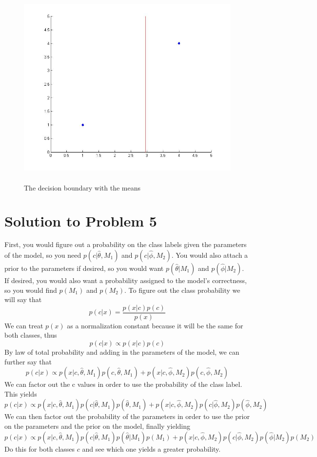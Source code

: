 \documentclass[11pt,psfig]{article}
\begin{document}
\begin{figure}[H]
\centering
\includegraphics[height=4in]{plot4_part2.jpg}
\caption{The decision boundary with the means}
\end{figure}

\newpage

\section*{Solution to Problem 5}

First, you would figure out a probability on the class labels given the parameters of the model, so you need
$p(c|\hat{\theta},M_1)$ and $p(c|\hat{\phi},M_2)$. You would also attach a prior to the parameters if desired, so you would want $p(\hat{\theta}|M_1)$ and $p(\hat{\phi}|M_2)$. If desired, you would also want a probability assigned to the model's correctness, so you would find $p(M_1)$ and $p(M_2)$. 
To figure out the class probability we will say that
\[
p(c|x) = \frac{p(x|c)p(c)}{p(x)}
\]
We can treat $p(x)$ as a normalization constant because it will be the same for both classes, thus
\[
p(c|x) \propto p(x|c)p(c)
\]
By law of total probability and adding in the parameters of the model, we can further say that
\[
p(c|x) \propto p(x|c,\hat{\theta},M_1)p(c,\hat{\theta},M_1) + p(x|c,\hat{\phi},M_2)p(c,\hat{\phi},M_2)
\]
We can factor out the c values in order to use the probability of the class label. This yields 
\[
p(c|x) \propto p(x|c,\hat{\theta},M_1)p(c|\hat{\theta},M_1)p(\hat{\theta},M_1) + p(x|c,\hat{\phi},M_2)p(c|\hat{\phi},M_2)p(\hat{\phi},M_2)
\]
We can then factor out the probability of the parameters in order to use the prior on the parameters and the prior on the model, finally yielding
\[
p(c|x) \propto p(x|c,\hat{\theta},M_1)p(c|\hat{\theta},M_1)p(\hat{\theta}|M_1)p(M_1) + p(x|c,\hat{\phi},M_2)p(c|\hat{\phi},M_2)p(\hat{\phi}|M_2)p(M_2)
\]
Do this for both classes $c$ and see which one yields a greater probability. 
\end{document}
